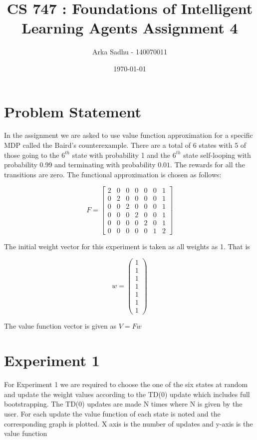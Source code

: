 \documentclass{article}
\title{CS 747 : Foundations of Intelligent Learning Agents Assignment 4}
\author{Arka Sadhu - 140070011}
\date{\today}
\begin{document}
\maketitle

\section{Problem Statement}
In the assignment we are asked to use value function approximation for a specific MDP called the Baird's counterexample. There are a total of 6 states with 5 of those going to the $6^{th}$ state with probability 1 and the $6^{th}$ state self-looping with probability 0.99 and terminating with probability $0.01$. The rewards for all the transitions are zero. The functional approximation is chosen as follows:

\[%
F= \begin{bmatrix}%
2&0&0&0&0&0&1\\%
0&2&0&0&0&0&1\\%
0&0&2&0&0&0&1\\%
0&0&0&2&0&0&1\\%
0&0&0&0&2&0&1\\%
0&0&0&0&0&1&2%
\end{bmatrix}%
\]

The initial weight vector for this experiment is taken as all weights as 1. That is

\[%
w= \begin{pmatrix}%
1\\%
1\\%
1\\%
1\\%
1\\%
1\\%
1%
\end{pmatrix}%
\]

The value function vector is given as $V = Fw$

\section{Experiment 1}
For Experiment 1 we are required to choose the one of the six states at random and update the weight values according to the TD(0) update which includes full bootstrapping. The TD(0) updates are made N times where N is given by the user. For each update the value function of each state is noted and the corresponding graph is plotted. X axis is the number of updates and y-axis is the value function
\end{document}
